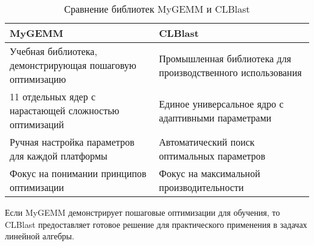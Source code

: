 \begin{table}[h]
\centering
\caption{Сравнение библиотек MyGEMM и CLBlast}
\label{tab:mygemm_vs_clblast}
\begin{tabular}{p{}p{}}
\hline
\textbf{MyGEMM} & \textbf{CLBlast} \\
\hline
Учебная библиотека, демонстрирующая пошаговую оптимизацию & Промышленная библиотека для производственного использования \\
\hline
11 отдельных ядер с нарастающей сложностью оптимизаций & Единое универсальное ядро с адаптивными параметрами \\
\hline
Ручная настройка параметров для каждой платформы & Автоматический поиск оптимальных параметров \\
\hline
Фокус на понимании принципов оптимизации & Фокус на максимальной производительности \\
\hline
\end{tabular}
\end{table}

Если MyGEMM демонстрирует пошаговые оптимизации для обучения, то CLBlast предоставляет готовое решение для практического применения в задачах линейной алгебры.
